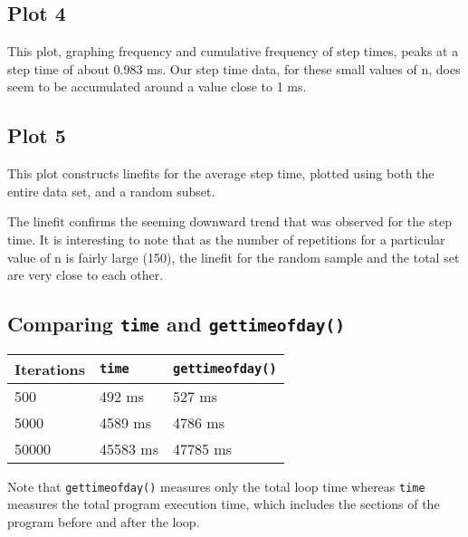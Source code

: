 \documentclass[11pt]{article}
\begin{document}
\subsection{Plot 4}


	This plot, graphing frequency and cumulative frequency of step times, peaks at a step time of about 0.983 ms. Our step time data, for these small values of n, does seem to be accumulated around a value close to 1 ms.

\subsection{Plot 5}


	This plot constructs linefits for the average step time, plotted using both the entire data set, and a random subset.
	
	The linefit confirms the seeming downward trend that was observed for the step time. It is interesting to note that as the number of repetitions for a particular value of n is fairly large (150), the linefit for the random sample and the total set are very close to each other.

\subsection{Comparing \texttt{time} and \texttt{gettimeofday()}}
	
	\vspace{0.5cm}

	\begin{center}
		\begin{tabular}{ | l | l | p{3cm} |}
			\hline
				Iterations & \texttt{time} & \texttt{gettimeofday()} \\ \hline
				500 & 492 ms & 527 ms \\ \hline
				5000 & 4589 ms & 4786 ms \\ \hline
				50000 & 45583 ms & 47785 ms \\ \hline
		\end{tabular}
	\end{center}

	Note that \texttt{gettimeofday()} measures only the total loop time whereas \texttt{time} measures the total program execution time, which includes the sections of the program before and after the loop.
\end{document}

